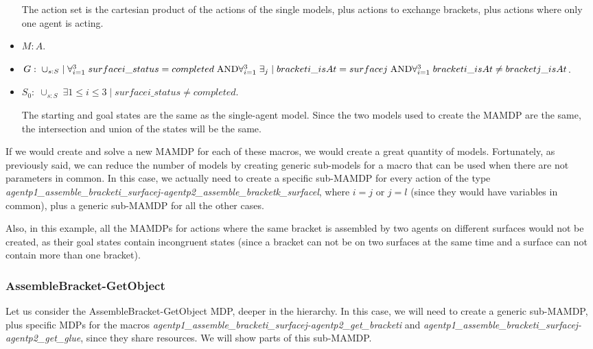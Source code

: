 \begin{itemize}
	The action set is the cartesian product of the actions of the single models, plus actions to exchange brackets, plus actions where only one agent is acting.
	\item $M: A$.
	\item $G:\; \cup_{s:S}\; |\; \forall_{i=1}^3\; surfacei\_status=completed\;\text{AND}\\
	\forall_{i=1}^3\; \exists_{j}\;|\;bracketi\_isAt=surfacej\; \text{AND}\\
	\forall_{i=1}^3\; bracketi\_isAt \neq bracketj\_isAt$.
	\item $S_0:\; \cup_{s:S} \; \exists{1\leq i \leq 3}\; |\; surfacei\_status \neq completed$.

	The starting and goal states are the same as the single-agent model. Since the two models used to create the MAMDP are the same, the intersection and union of the states will be the same.
\end{itemize}


If we would create and solve a new MAMDP for each of these macros, we would create a great quantity of models. Fortunately, as previously said, we can reduce the number of models by creating generic sub-models for a macro that can be used when there are not parameters in common. In this case, we actually need to create a specific sub-MAMDP for every action of the type \textit{agentp1\_assemble\_bracketi\_surfacej-agentp2\_assemble\_bracketk\_surfacel}, where $i=j$ or $j=l$ (since they would have variables in common), plus a generic sub-MAMDP for all the other cases.

Also, in this example, all the MAMDPs for actions where the same bracket is assembled by two agents on different surfaces would not be created, as their goal states contain incongruent states (since a bracket can not be on two surfaces at the same time and a surface can not contain more than one bracket).

\subsubsection{AssembleBracket-GetObject}
Let us consider the AssembleBracket-GetObject MDP, deeper in the hierarchy. In this case, we will need to create a generic sub-MAMDP, plus specific MDPs for the macros \textit{agentp1\_assemble\_bracketi\_surfacej-agentp2\_get\_bracketi} and \textit{agentp1\_assemble\_bracketi\_surfacej-agentp2\_get\_glue}, since they share resources. We will show parts of this sub-MAMDP.  


